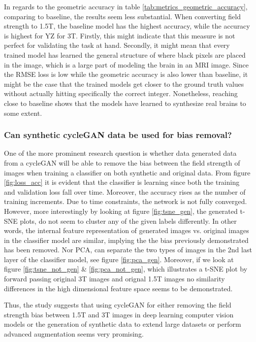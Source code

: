\documentclass[12pt, fleqn, titlepage]{article}
\newcommand{\1}[1]{\mathds{1}\left[#1\right]}
\begin{document}
In regards to the geometric accuracy in table \ref{tab:metrics_geometric_accuracy}, comparing to baseline, the results seem less substantial. When converting field strength to 1.5T, the baseline model has the highest accuracy, while the accuracy is highest for YZ for 3T. Firstly, this might indicate that this measure is not perfect for validating the task at hand. Secondly, it might mean that every trained model has learned the general structure of where black pixels are placed in the image, which is a large part of modeling the brain in an MRI image. Since the RMSE loss is low while the geometric accuracy is also lower than baseline, it might be the case that the trained models get closer to the ground truth values without actually hitting specifically the correct integer. Nonetheless, reaching close to baseline shows that the models have learned to synthesize real brains to some extent.



\subsubsection{Can synthetic cycleGAN data be used for bias removal?}
One of the more prominent research question is whether data generated data from a cycleGAN will be able to remove the bias between the field strength of images when training a classifier on both synthetic and original data. From figure \ref{fig:loss_acc} it is evident that the classifier is learning since both the training and validation loss fall over time. Moreover, the accuracy rises as the number of training increments. Due to time constraints, the network is not fully converged. However, more interestingly by looking at figure \ref{fig:tsne_gen}, the generated t-SNE plots, do not seem to cluster any of the given labels differently. In other words, the internal feature representation of generated images vs. original images in the classifier model are similar, implying the the bias previously demonstrated has been removed. Nor PCA, can separate the two types of images in the 2nd last layer of the classifier model, see figure \ref{fig:pca_gen}. Moreover, if we look at figure \ref{fig:tsne_not_gen} \& \ref{fig:pca_not_gen}, which illustrates a t-SNE plot by forward passing original 3T images and orignal 1.5T images no similarity differences in the high dimensional feature space seems to be demonstrated.

Thus, the study suggests that using cycleGAN for either removing the field strength bias between 1.5T and 3T images in deep learning computer vision models or the generation of synthetic data to extend large datasets or perform advanced augmentation seems very promising. 
\end{document}
